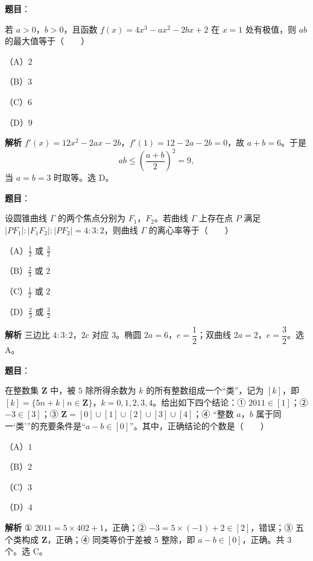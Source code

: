 \begin{answer}

\textbf{题目}：

若 $a>0$，$b>0$，且函数 $f(x)=4x^3-ax^2-2bx+2$ 在 $x=1$ 处有极值，则 $ab$ 的最大值等于\mbox{（　　）}

（A）$2$

（B）$3$

（C）$6$

（D）$9$

\textbf{解析}
$f'(x)=12x^2-2ax-2b$，$f'(1)=12-2a-2b=0$，故 $a+b=6$。于是
\nopagebreak[4]
\[ab\leqslant\left(\frac{a+b}2\right)^2=9,\]
当 $a=b=3$ 时取等。选 D。


\end{answer}
\begin{answer}

\textbf{题目}：

设圆锥曲线 $\Gamma$ 的两个焦点分别为 $F_1$，$F_2$。若曲线 $\Gamma$ 上存在点 $P$ 满足 $|PF_1|:|F_1F_2|:|PF_2|=4:3:2$，则曲线 $\Gamma$ 的离心率等于\mbox{（　　）}

（A）$\frac12$ 或 $\frac32$

（B）$\frac23$ 或 $2$

（C）$\frac12$ 或 $2$

（D）$\frac23$ 或 $\frac32$

\textbf{解析}
三边比 $4:3:2$，$2c$ 对应 $3$。椭圆 $2a=6$，$e=\dfrac12$；双曲线 $2a=2$，$e=\dfrac32$。选 A。


\end{answer}
\begin{answer}

\textbf{题目}：

在整数集 $\mathbf Z$ 中，被 $5$ 除所得余数为 $k$ 的所有整数组成一个“类”，记为 $[k]$，即 $[k]=\{5n+k\mid n\in\mathbf Z\}$，$k=0,1,2,3,4$。给出如下四个结论：① $2011\in[1]$；② $-3\in[3]$；③ $\mathbf Z=[0]\cup[1]\cup[2]\cup[3]\cup[4]$；④ “整数 $a$，$b$ 属于同一‘类’”的充要条件是“$a-b\in[0]$”。其中，正确结论的个数是\mbox{（　　）}

（A）$1$

（B）$2$

（C）$3$

（D）$4$

\textbf{解析}
① $2011=5\times402+1$，正确；② $-3=5\times(-1)+2\in[2]$，错误；③ 五个类构成 $\mathbf Z$，正确；④ 同类等价于差被 $5$ 整除，即 $a-b\in[0]$，正确。共 $3$ 个。选 C。


\end{answer}
